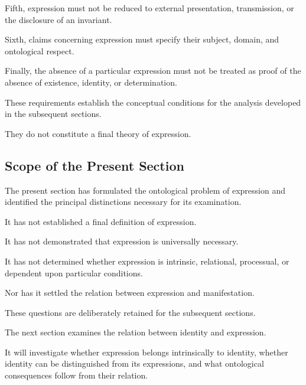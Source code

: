 Fifth, expression must not be reduced
to external presentation, transmission,
or the disclosure of an invariant.

Sixth, claims concerning expression
must specify their subject, domain,
and ontological respect.

Finally, the absence of a particular
expression must not be treated as
proof of the absence of existence,
identity, or determination.

These requirements establish the
conceptual conditions for the analysis
developed in the subsequent sections.

They do not constitute a final theory
of expression.

\subsection{Scope of the Present Section}

The present section has formulated
the ontological problem of expression
and identified the principal distinctions
necessary for its examination.

It has not established a final definition
of expression.

It has not demonstrated that expression
is universally necessary.

It has not determined whether expression
is intrinsic, relational, processual,
or dependent upon particular conditions.

Nor has it settled the relation between
expression and manifestation.

These questions are deliberately retained
for the subsequent sections.

The next section examines the relation
between identity and expression.

It will investigate whether expression
belongs intrinsically to identity,
whether identity can be distinguished
from its expressions, and what ontological
consequences follow from their relation.

